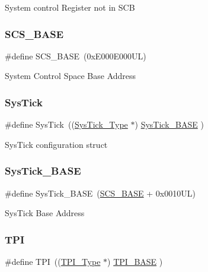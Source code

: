 System control Register not in S\+CB \mbox{\label{group__CMSIS__core__base_ga3c14ed93192c8d9143322bbf77ebf770}} 
\subsubsection{\texorpdfstring{SCS\_BASE}{SCS\_BASE}}
{\footnotesize\ttfamily \#define S\+C\+S\+\_\+\+B\+A\+SE~(0x\+E000\+E000\+U\+L)}

System Control Space Base Address \mbox{\label{group__CMSIS__core__base_gacd96c53beeaff8f603fcda425eb295de}} 
\subsubsection{\texorpdfstring{SysTick}{SysTick}}
{\footnotesize\ttfamily \#define Sys\+Tick~((\mbox{\hyperlink{structSysTick__Type}{Sys\+Tick\+\_\+\+Type}}   $\ast$)     \mbox{\hyperlink{group__CMSIS__core__base_ga58effaac0b93006b756d33209e814646}{Sys\+Tick\+\_\+\+B\+A\+SE}}  )}

Sys\+Tick configuration struct \mbox{\label{group__CMSIS__core__base_ga58effaac0b93006b756d33209e814646}} 
\subsubsection{\texorpdfstring{SysTick\_BASE}{SysTick\_BASE}}
{\footnotesize\ttfamily \#define Sys\+Tick\+\_\+\+B\+A\+SE~(\mbox{\hyperlink{group__CMSIS__core__base_ga3c14ed93192c8d9143322bbf77ebf770}{S\+C\+S\+\_\+\+B\+A\+SE}} +  0x0010\+U\+L)}

Sys\+Tick Base Address \mbox{\label{group__CMSIS__core__base_ga8b4dd00016aed25a0ea54e9a9acd1239}} 
\subsubsection{\texorpdfstring{TPI}{TPI}}
{\footnotesize\ttfamily \#define T\+PI~((\mbox{\hyperlink{structTPI__Type}{T\+P\+I\+\_\+\+Type}}       $\ast$)     \mbox{\hyperlink{group__CMSIS__core__base_ga2b1eeff850a7e418844ca847145a1a68}{T\+P\+I\+\_\+\+B\+A\+SE}}      )}

